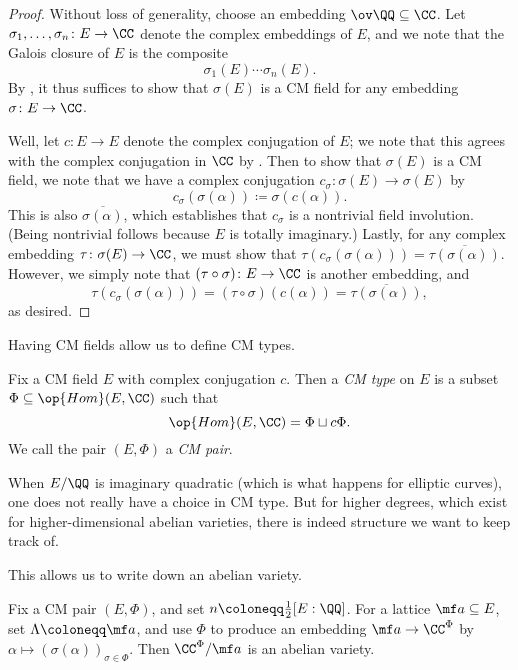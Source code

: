 \documentclass[../notes.tex]{subfiles}
\begin{document}
\begin{proof}
	Without loss of generality, choose an embedding $\ov\QQ\subseteq\CC$. Let $\sigma_1,\ldots,\sigma_n\colon E\to\CC$ denote the complex embeddings of $E$, and we note that the Galois closure of $E$ is the composite
	\[\sigma_1(E)\cdots\sigma_n(E).\]
	By , it thus suffices to show that $\sigma(E)$ is a CM field for any embedding $\sigma\colon E\to\CC$.
	
	Well, let $c\colon E\to E$ denote the complex conjugation of $E$; we note that this agrees with the complex conjugation in $\CC$ by .
	Then to show that $\sigma(E)$ is a CM field, we note that we have a complex conjugation $c_\sigma\colon\sigma(E)\to\sigma(E)$ by
	\[c_\sigma(\sigma(\alpha))\coloneqq\sigma(c(\alpha)).\]
	This is also $\overline{\sigma(\alpha)}$, which establishes that $c_\sigma$ is a nontrivial field involution. (Being nontrivial follows because $E$ is totally imaginary.) Lastly, for any complex embedding $\tau\colon\sigma(E)\to\CC$, we must show that $\tau(c_\sigma(\sigma(\alpha)))=\overline{\tau(\sigma(\alpha))}$. However, we simply note that $(\tau\circ\sigma)\colon E\to\CC$ is another embedding, and
	\[\tau(c_\sigma(\sigma(\alpha)))=(\tau\circ\sigma)(c(\alpha))=\overline{\tau(\sigma(\alpha))},\]
	as desired.
\end{proof}
Having CM fields allow us to define CM types.
\begin{definition}[CM type]
	Fix a CM field $E$ with complex conjugation $c$. Then a \textit{CM type} on $E$ is a subset $\Phi\subseteq\op{Hom}(E,\CC)$ such that
	\[\op{Hom}(E,\CC)=\Phi\sqcup c\Phi.\]
	We call the pair $(E,\Phi)$ a \textit{CM pair}.
\end{definition}
\begin{remark}
	When $E/\QQ$ is imaginary quadratic (which is what happens for elliptic curves), one does not really have a choice in CM type. But for higher degrees, which exist for higher-dimensional abelian varieties, there is indeed structure we want to keep track of.
\end{remark}
This allows us to write down an abelian variety.
\begin{exe}
	Fix a CM pair $(E,\Phi)$, and set $n\coloneqq\frac12[E:\QQ]$. For a lattice $\mf a\subseteq E$, set $\Lambda\coloneqq\mf a$, and use $\Phi$ to produce an embedding $\mf a\to\CC^\Phi$ by $\alpha\mapsto(\sigma(\alpha))_{\sigma\in\Phi}$. Then $\CC^\Phi/\mf a$ is an abelian variety.
\end{exe}
\end{document}
